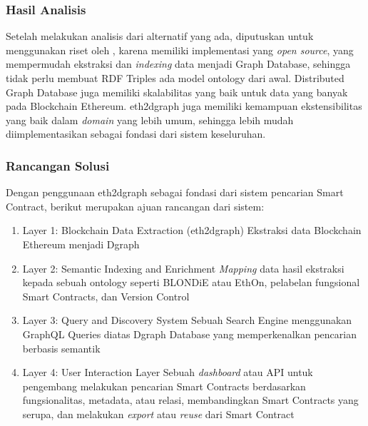 
\subsubsection{Hasil Analisis}

Setelah melakukan analisis dari alternatif yang ada, diputuskan untuk menggunakan riset oleh \cite{aimar2023extraction}, karena memiliki implementasi yang \textit{open source}, yang mempermudah ekstraksi dan \textit{indexing} data menjadi Graph Database, sehingga tidak perlu membuat RDF Triples ada model ontology dari awal. Distributed Graph Database juga memiliki skalabilitas yang baik untuk data yang banyak pada Blockchain Ethereum. eth2dgraph juga memiliki kemampuan ekstensibilitas yang baik dalam \textit{domain} yang lebih umum, sehingga lebih mudah diimplementasikan sebagai fondasi dari sistem keseluruhan.

\subsubsection{Rancangan Solusi}

Dengan penggunaan eth2dgraph sebagai fondasi dari sistem pencarian Smart Contract, berikut merupakan ajuan rancangan dari sistem:

\begin{enumerate}
	\item Layer 1: Blockchain Data Extraction (eth2dgraph) \newline Ekstraksi data Blockchain Ethereum menjadi Dgraph
	\item Layer 2: Semantic Indexing and Enrichment \newline \textit{Mapping} data hasil ekstraksi kepada sebuah ontology seperti BLONDiE atau EthOn, pelabelan fungsional Smart Contracts, dan Version Control
	\item Layer 3: Query and Discovery System \newline Sebuah Search Engine menggunakan GraphQL Queries diatas Dgraph Database yang memperkenalkan pencarian berbasis semantik
	\item Layer 4: User Interaction Layer \newline Sebuah \textit{dashboard} atau API untuk pengembang melakukan pencarian Smart Contracts berdasarkan fungsionalitas, metadata, atau relasi, membandingkan Smart Contracts yang serupa, dan melakukan \textit{export} atau \textit{reuse} dari Smart Contract
\end{enumerate}
